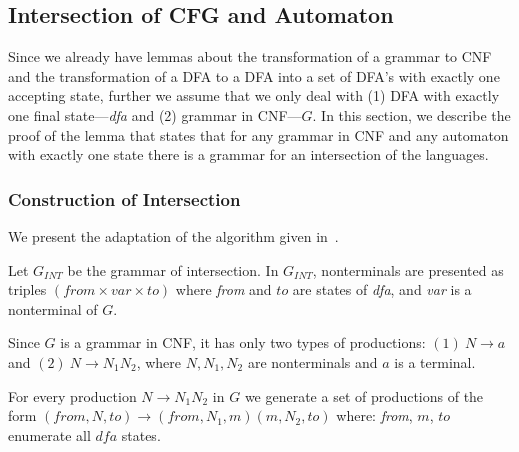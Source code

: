 \subsection{Intersection of CFG and Automaton}

Since we already have lemmas about the transformation of a grammar to CNF and the transformation of a DFA to a DFA into a set of DFA's with exactly one accepting state, further we assume that we only deal with (1) DFA with exactly one final state---\textit{dfa} and (2) grammar in CNF---$G$. In this section, we describe the proof of the lemma that states that for any grammar in CNF and any automaton with exactly one state there is a grammar for an intersection of the languages.

\subsubsection{Construction of Intersection}

We present the adaptation of the algorithm given in~\cite{beigelproof}.

Let $G_{INT}$ be the grammar of intersection. In $G_{INT}$, nonterminals are presented as triples $(\textit{from} \times var \times to) $ where \textit{from} and $to$ are states of \textit{dfa}, and \textit{var} is a nonterminal of $G$.

Since $G$ is a grammar in CNF, it has only two types of productions: $(1)\ N \to a $ and $(2) \ N \to N_{1} N_{2}$, where $N, N_1, N_2$ are nonterminals and $a$ is a terminal.

For every production $N \to N_1 N_2$ in $G$ we generate a set of productions of the form $(\textit{from}, N, to) \to (\textit{from}, N_1,  m) (m, N_2, to)$ where: \textit{from}, $m$, $to$ enumerate all $\textit{dfa}$ states.

%


